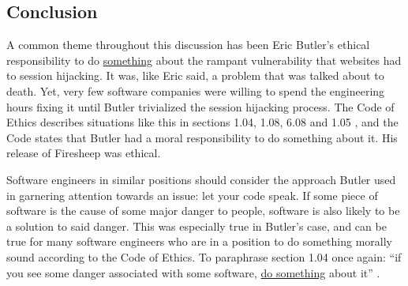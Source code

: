 \documentclass[11pt]{article}
\begin{document}
\begin{multicols}{2}
\section{Conclusion}
A common theme throughout this discussion has been Eric Butler's ethical responsibility to do \uline{something} about the rampant vulnerability that websites had to session hijacking. It was, like Eric said, a problem that was talked about to death. Yet, very few software companies were willing to spend the engineering hours fixing it until Butler trivialized the session hijacking process. The Code of Ethics describes situations like this in sections 1.04, 1.08, 6.08 and 1.05 \cite{se-code}, and the Code  states that Butler had a moral responsibility to do something about it. His release of Firesheep was  ethical.

Software engineers in similar positions should consider the approach Butler used in garnering attention towards an issue: let your code speak. If some piece of software is the cause of some major danger to people, software is also likely to be a solution to said danger. This was especially true in Butler's case, and can be true for many software engineers who are in a position to do something morally sound according to the Code of Ethics. To paraphrase section 1.04 once again: ``if you see some danger associated with some software, \uline{do something} about it'' \cite{se-code}.


\end{multicols}
\newpage

\nocite{*}




\end{document}
